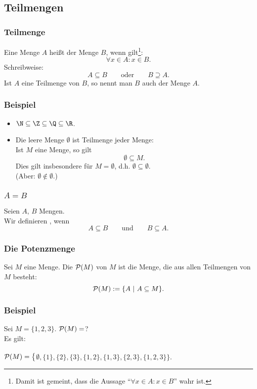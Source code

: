 \subsection{Teilmengen}
%
\begin{frame}\frametitle{Teilmenge}
	
	Eine Menge $A$ hei{\ss}t  der Menge $B$, wenn gilt\footnote{
		Damit ist gemeint, dass die Aussage ``$\forall x\in A: x\in B$'' wahr ist.}:
	$$
		\forall x\in A: x\in B.
	$$
	Schreibweise:
	$$
		A \subseteq B\qquad \text{oder} \qquad B \supseteq A.
	$$
	\vfill
	Ist $A$ eine Teilmenge von $B$, so nennt man $B$ auch  der Menge $A$.
\end{frame}
%
%
\begin{frame}\frametitle{Beispiel}
	
	\begin{itemize}
		\item $\N \subseteq \Z \subseteq \Q \subseteq \R$.
		\pause
		\item Die leere Menge $\emptyset$ ist Teilmenge jeder Menge:\\
			Ist $M$ eine Menge, so gilt
			$$
				\emptyset \subseteq M.
			$$
			Dies gilt insbesondere für $M=\emptyset$, d.h. $\emptyset \subseteq \emptyset$.\\
			(Aber: $\emptyset \notin \emptyset$.)
	\end{itemize}
	
\end{frame}
%
%
\begin{frame}\frametitle{$A=B$}
	
	Seien $A$, $B$ Mengen.\\
	Wir definieren , wenn
	$$
		A \subseteq B \qquad\text{und}\qquad B\subseteq A.
	$$
	
\end{frame}
%

%
\begin{frame}\frametitle{Die Potenzmenge}
	
	Sei $M$ eine Menge. Die  ${\cal P}(M)$ von $M$ ist die Menge, 
	die aus allen Teilmengen von $M$ besteht:
	$$
		{\cal P}(M) := \{ A ~|~ A \subseteq M \}.
	$$
\end{frame}
%
%
\begin{frame}\frametitle{Beispiel}

	Sei $M = \{ 1,2,3 \}$.  ${\cal P}(M) =$?\\[2mm]
	\pause
	Es gilt: \\\quad\\
	$
		{\cal P}(M) = \big\{$\pause$ \emptyset, $\pause$ \{1\}, \{2\}, \{3\},$\pause$ \{1,2\}, \{1,3\}, \{2,3\}, $\pause$ \{1,2,3\} \big\}.
	$

\end{frame}
%
